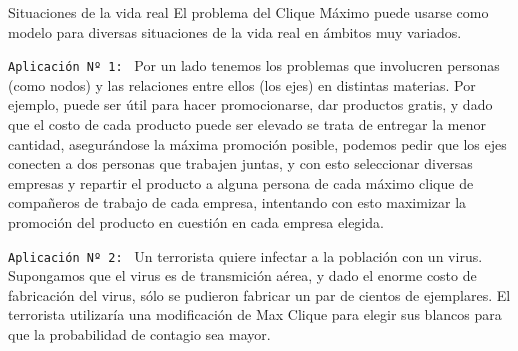 \documentclass[12pt,titlepage]{article}
\newcommand{\Pa}{\vspace{5mm}}
\begin{document}
	\begin{section}{Situaciones de la vida real}
		El problema del Clique Máximo puede usarse como modelo para diversas situaciones de la vida real en ámbitos muy variados.\Pa
		
		\texttt{Aplicación Nº 1: }
			Por un lado tenemos los problemas que involucren personas (como nodos) y las relaciones entre ellos (los ejes) en distintas materias. Por ejemplo, puede ser útil para hacer promocionarse, dar productos gratis, y dado que el costo de cada producto puede ser elevado se trata de entregar la menor cantidad, asegurándose la máxima promoción posible, podemos pedir que los ejes conecten a dos personas que trabajen juntas, y con esto seleccionar diversas empresas y repartir el producto a alguna persona de cada máximo clique de compañeros de trabajo de cada empresa, intentando con esto maximizar la promoción del producto en cuestión en cada empresa elegida.\Pa %


			
		\texttt{Aplicación Nº 2: }
			Un terrorista quiere infectar a la población con un virus. Supongamos que el virus es de transmición aérea, y dado el enorme costo de fabricación del virus, sólo se pudieron fabricar un par de cientos de ejemplares. El terrorista utilizaría una modificación de Max Clique para elegir sus blancos para que la probabilidad de contagio sea mayor. 
	\newpage
	\end{section}
	
	
\end{document}
